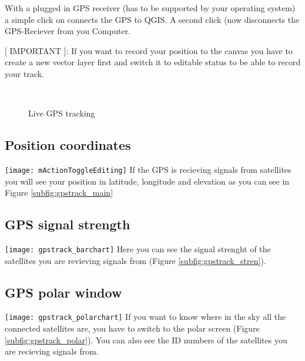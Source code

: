 With a plugged in GPS receiver (has to be supported by your operating system)
a simple click on  connects the GPS to QGIS. A second click
(now  disconnects the GPS-Reciever from you Computer.

[ IMPORTANT ]: If you want to record your position to the canvas you have to
create a new vector layer first and switch it to editable status to be able
to record your track.

\begin{figure}[ht]
\centering
     \hspace{0.33cm}
     \hspace{0.33cm}
    \\
\caption{Live GPS tracking \nixcaption} \label{fig:gpstrack_live}
\end{figure}

\subsection{Position coordinates}
\texttt{[image: mActionToggleEditing]} If the GPS is
recieving signals from satellites you will see your position in latitude,
longitude and elevation as you can see in Figure \ref{subfig:gpstrack_main}

\subsection{GPS signal strength}
\texttt{[image: gpstrack\_barchart]} Here you can see
the signal strenght of the satellites you are revieving signals from
(Figure \ref{subfig:gpstrack_stren}).

\subsection{GPS polar window}
\texttt{[image: gpstrack\_polarchart]} If you want
to know where in the sky all the connected satellites are, you have to
switch to the polar screen (Figure \ref{subfig:gpstrack_polar}).
You can also see the ID numbers of the satellites you are recieving signals from.

